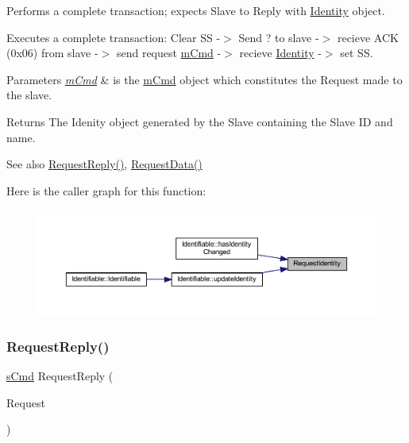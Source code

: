 Performs a complete transaction; expects Slave to Reply with \mbox{\hyperlink{struct_identity}{Identity}} object. 

Executes a complete transaction\+: Clear SS -\/$>$ Send \textquotesingle{}?\textquotesingle{} to slave -\/$>$ recieve \textquotesingle{}A\+CK\textquotesingle{} (0x06) from slave -\/$>$ send request \mbox{\hyperlink{structm_cmd}{m\+Cmd}} -\/$>$ recieve \mbox{\hyperlink{struct_identity}{Identity}} -\/$>$ set SS. 
\begin{DoxyParams}{Parameters}
{\em \mbox{\hyperlink{structm_cmd}{m\+Cmd}}} & is the \mbox{\hyperlink{structm_cmd}{m\+Cmd}} object which constitutes the Request made to the slave. \\
\hline
\end{DoxyParams}
\begin{DoxyReturn}{Returns}
The Idenity object generated by the Slave containing the Slave ID and name. 
\end{DoxyReturn}
\begin{DoxySeeAlso}{See also}
\mbox{\hyperlink{class_communicative_a4fe112ad5a3d693e39ae44dd43eaf0c1}{Request\+Reply()}}, \mbox{\hyperlink{class_communicative_a0a56aaa3248edae66ccb13cbf2bf156a}{Request\+Data()}} 
\end{DoxySeeAlso}
Here is the caller graph for this function\+:
\nopagebreak
\begin{figure}[H]
\begin{center}
\leavevmode
\includegraphics[width=350pt]{class_communicative_a01ee3d76d85bad6123c4d4f6262c6c2d_icgraph}
\end{center}
\end{figure}
\mbox{\label{class_communicative_a4fe112ad5a3d693e39ae44dd43eaf0c1}} 
\subsubsection{\texorpdfstring{RequestReply()}{RequestReply()}}
{\footnotesize\ttfamily \mbox{\hyperlink{structs_cmd}{s\+Cmd}} Request\+Reply (\begin{DoxyParamCaption}\item[{const \mbox{\hyperlink{structm_cmd}{m\+Cmd}}}]{Request }\end{DoxyParamCaption})}



